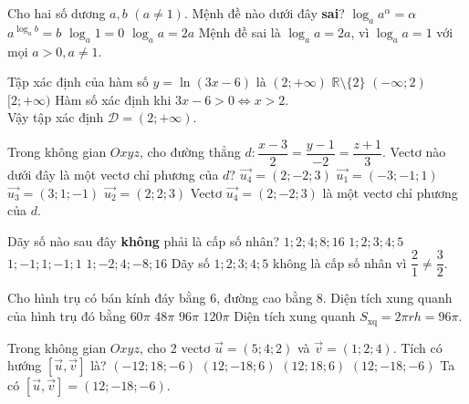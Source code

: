 \begin{ex}%
Cho hai số dương $a,b$ $(a\ne 1)$. Mệnh đề nào dưới đây \textbf{sai}?
\choice
{$\log_a a^{\alpha}=\alpha$}
{$a^{\log_a b}=b$}
{$\log_a 1=0$}
{\True $\log_a a=2a$}
\loigiai
{
Mệnh đề sai là $\log_a a=2a$, vì $\log_aa=1$ với mọi $a>0,a\ne 1$.
}
\end{ex}

\begin{ex}%
Tập xác định của hàm số $y=\ln (3x-6)$ là
\choice
{\True $(2;+\infty)$}
{$\mathbb{R}\setminus\{2\}$}
{$(-\infty;2)$}
{$[2;+\infty)$}
\loigiai
{
Hàm số xác định khi $3x-6>0\Leftrightarrow x>2$.\\
Vậy tập xác định $\mathscr{D}=(2;+\infty)$.
}
\end{ex}

\begin{ex}%
Trong không gian $O x y z$, cho đường thẳng $d\colon\dfrac{x-3}{2}=\dfrac{y-1}{-2}=\dfrac{z+1}{3}$. Vectơ nào dưới đây là một vectơ chỉ phương của $d$?
\choice
{\True $\overrightarrow{u_4}=(2;-2;3)$}
{$\overrightarrow{u_1}=(-3;-1;1)$}
{$\overrightarrow{u_3}=(3;1;-1)$}
{$\overrightarrow{u_2}=(2;2;3)$}
\loigiai
{
Vectơ $\overrightarrow{u_4}=(2;-2;3)$ là một vectơ chỉ phương của $d$.
}
\end{ex}

\begin{ex}%
Dãy số nào sau đây \textbf{không} phải là cấp số nhân?
\choice
{$1;2;4;8;16$}
{\True $1;2;3;4;5$}
{$1;-1;1;-1;1$}
{$1;-2;4;-8;16$}
\loigiai
{
Dãy số $1;2;3;4;5$ không là cấp số nhân vì $\dfrac{2}{1}\ne \dfrac{3}{2}$.
}
\end{ex}

\begin{ex}%
Cho hình trụ có bán kính đáy bằng 6, đường cao bằng 8. Diện tích xung quanh của hình trụ đó bằng
\choice
{$60\pi$}
{$48\pi$}
{\True $96\pi$}
{$120\pi$}
\loigiai
{
Diện tích xung quanh $S_{\text{xq}}=2\pi rh=96\pi$.
}
\end{ex}

\begin{ex}%
Trong không gian $O x y z$, cho 2 vectơ $\overrightarrow{u}=(5;4;2)$ và $\overrightarrow{v}=(1;2;4)$. Tích có hướng $[\overrightarrow{u},\overrightarrow{v}]$ là?
\choice
{$(-12;18;-6)$}
{$(12;-18;6)$}
{$(12;18;6)$}
{\True $(12;-18;-6)$}
\loigiai
{
Ta có $[\overrightarrow{u},\overrightarrow{v}]=(12;-18;-6)$.
}
\end{ex}

